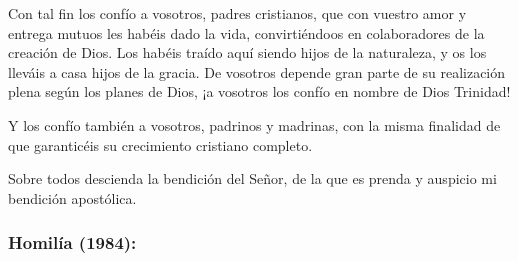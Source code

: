 \begin{body}
					Con tal fin los confío a vosotros, padres cristianos, que con vuestro amor y entrega mutuos les habéis dado la vida, convirtiéndoos en colaboradores de la creación de Dios. Los habéis traído aquí siendo hijos de la naturaleza, y os los lleváis a casa hijos de la gracia. De vosotros depende gran parte de su realización plena según los planes de Dios, ¡a vosotros los confío en nombre de Dios Trinidad!
					
					Y los confío también a vosotros, padrinos y madrinas, con la misma finalidad de que garanticéis su crecimiento cristiano completo.
					
					Sobre todos descienda la bendición del Señor, de la que es prenda y auspicio mi bendición apostólica.
				\end{body}
			
			\subsubsection{Homilía (1984):}
			
				

